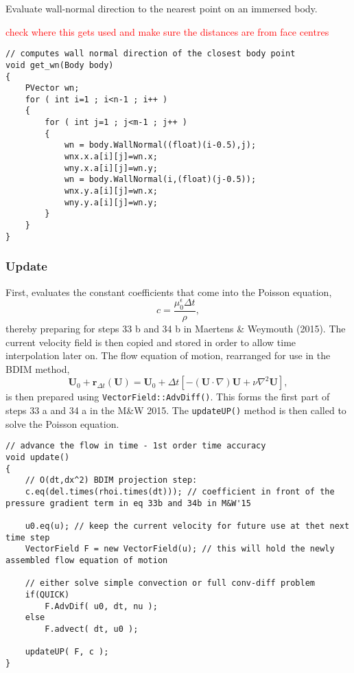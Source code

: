 \documentclass[notitlepage]{article}
\begin{document}
Evaluate wall-normal direction to the nearest point on an immersed body.

\textcolor{red}{check where this gets used and make sure the distances are from face centres}

\begin{lstlisting}[style=myCpp]
// computes wall normal direction of the closest body point
void get_wn(Body body)
{
	PVector wn;
	for ( int i=1 ; i<n-1 ; i++ )
	{
		for ( int j=1 ; j<m-1 ; j++ )
		{
			wn = body.WallNormal((float)(i-0.5),j);
			wnx.x.a[i][j]=wn.x;
			wny.x.a[i][j]=wn.y;
			wn = body.WallNormal(i,(float)(j-0.5));
			wnx.y.a[i][j]=wn.x;
			wny.y.a[i][j]=wn.y;
		}
	}   
}
\end{lstlisting}

\subsubsection{Update}

First, evaluates the constant coefficients that come into the Poisson equation,
%
\begin{equation}\label{eq:PoissonCoeffsLhs}
c = \frac{\mu_0^\epsilon \Delta t}{\rho} ,
\end{equation}
%
thereby preparing for steps 33 b and 34 b in Maertens \& Weymouth (2015).
The current velocity field is then copied and stored in order to allow
time interpolation later on.
The flow equation of motion, rearranged for use in the BDIM method,
%
\begin{equation}\label{eq:BDIM_NS}
\mathbf{U}_0 + \mathbf{r}_{\Delta t}(\mathbf{U}) =
	\mathbf{U}_0 + \Delta t \left \lbrack -(\mathbf{U} \cdot \nabla) \mathbf{U}
		+ \nu \nabla^2 \mathbf{U} \right \rbrack ,
\end{equation}
%
is then prepared using \texttt{VectorField::AdvDiff()}. This forms the first part
of steps 33 a and 34 a in the M\&W 2015.
The \texttt{updateUP()} method is then called to solve the Poisson equation.

\begin{lstlisting}[style=myCpp]
// advance the flow in time - 1st order time accuracy
void update()
{
	// O(dt,dx^2) BDIM projection step:
	c.eq(del.times(rhoi.times(dt))); // coefficient in front of the pressure gradient term in eq 33b and 34b in M&W'15

	u0.eq(u); // keep the current velocity for future use at thet next time step
	VectorField F = new VectorField(u); // this will hold the newly assembled flow equation of motion

	// either solve simple convection or full conv-diff problem
	if(QUICK)
		F.AdvDif( u0, dt, nu );
	else
		F.advect( dt, u0 );

	updateUP( F, c );
}
\end{lstlisting}
\end{document}
